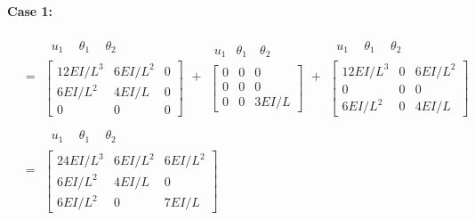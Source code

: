 \begin{example}
\leavevmode

\textbf{Case 1:}
\begin{fig}
  
\end{fig}
{\small
\begin{align*}
  [k] &= \begin{array}{c}\begin{array}{ccc}\ u_1\ & \ \theta_1\ & \ \theta_2\ \end{array}\\ \left[\begin{array}{ccc}12EI/L^3 & 6EI/L^2 & 0\\ 6EI/L^2 & 4EI/L & 0\\ 0 & 0 & 0\end{array}\right]\end{array}
  + \begin{array}{c}\begin{array}{ccc}u_1 & \theta_1 & \ \theta_2\ \end{array}\\ \left[\begin{array}{ccc}0 & 0 & 0\\ 0 & 0 & 0\\ 0 & 0 & 3EI/L\end{array}\right]\end{array}
  + \begin{array}{c}\begin{array}{ccc}\ u_1\ & \ \theta_1\ & \ \theta_2\ \end{array}\\ \left[\begin{array}{ccc}12EI/L^3 & 0 & 6EI/L^2\\ 0 & 0 & 0\\ 6EI/L^2 & 0 & 4EI/L\end{array}\right]\end{array}\\
  &= \begin{array}{c}\begin{array}{ccc}\ u_1\ & \ \theta_1\ & \ \theta_2\ \end{array}\\ \left[\begin{array}{ccc}24EI/L^3 & 6EI/L^2 & 6EI/L^2\\ 6EI/L^2 & 4EI/L & 0\\ 6EI/L^2 & 0 & 7EI/L\end{array}\right]\end{array}

\end{align*}}
\end{example}
